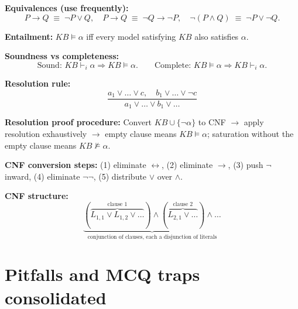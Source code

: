 \documentclass[11pt, a4paper]{article}
\begin{document}
\textbf{Equivalences (use frequently):}
\[
P \rightarrow Q \;\equiv\; \neg P \lor Q, \quad P \rightarrow Q \;\equiv\; \neg Q \rightarrow \neg P, \quad \neg(P \land Q) \;\equiv\; \neg P \lor \neg Q.
\]

\textbf{Entailment:} $KB \models \alpha$ iff every model satisfying $KB$ also satisfies $\alpha$.

\textbf{Soundness vs completeness:}
\[
\text{Sound: } KB \vdash_i \alpha \Rightarrow KB \models \alpha. \qquad
\text{Complete: } KB \models \alpha \Rightarrow KB \vdash_i \alpha.
\]

\textbf{Resolution rule:}
\[
\frac{a_1 \lor \dots \lor c, \quad b_1 \lor \dots \lor \neg c}{a_1 \lor \dots \lor b_1 \lor \dots}
\]

\textbf{Resolution proof procedure:} Convert $KB \cup \{\neg\alpha\}$ to CNF $\to$ apply resolution exhaustively $\to$ empty clause means $KB \models \alpha$; saturation without the empty clause means $KB \not\models \alpha$.

\textbf{CNF conversion steps:} (1) eliminate $\leftrightarrow$, (2) eliminate $\rightarrow$, (3) push $\neg$ inward, (4) eliminate $\neg\neg$, (5) distribute $\lor$ over $\land$.

\textbf{CNF structure:}
\[
\underbrace{(\overbrace{L_{1,1} \lor L_{1,2} \lor \dots}^{\text{clause 1}}) \land (\overbrace{L_{2,1} \lor \dots}^{\text{clause 2}}) \land \dots}_{\text{conjunction of clauses, each a disjunction of literals}}
\]

\section*{Pitfalls and MCQ traps consolidated}
\end{document}
